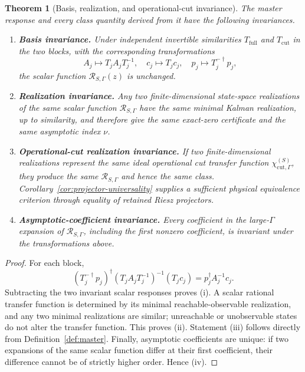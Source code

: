 \documentclass[11pt]{article}
\newtheorem{theorem}{Theorem}[section]
\theoremstyle{definition}
\theoremstyle{remark}
\theoremstyle{plain}
\newcommand{\R}{\mathcal R}
\newcommand{\full}{\mathrm{full}}
\newcommand{\cut}{\mathrm{cut}}
\begin{document}
\begin{theorem}[Basis, realization, and operational-cut invariance]\label{thm:invariance}
The master response and every class quantity derived from it have the following invariances.
\begin{enumerate}[label=(\roman*)]
  \item \textbf{Basis invariance.}  Under independent invertible similarities $T_{\full}$ and $T_{\cut}$ in the two blocks, with the corresponding transformations
  \[
   A_j\mapsto T_jA_jT_j^{-1},\quad c_j\mapsto T_jc_j,
   \quad p_j\mapsto T_j^{-\dagger}p_j,
  \]
  the scalar function $\R_{S,\Gamma}(z)$ is unchanged.
  \item \textbf{Realization invariance.}  Any two finite-dimensional state-space realizations of the same scalar function $\R_{S,\Gamma}$ have the same minimal Kalman realization, up to similarity, and therefore give the same exact-zero certificate and the same asymptotic index $\nu$.
  \item \textbf{Operational-cut realization invariance.}  If two finite-dimensional realizations represent the same ideal operational cut transfer function $\chi_{\cut,\Gamma}^{(S)}$, they produce the same $\R_{S,\Gamma}$ and hence the same class.  Corollary~\ref{cor:projector-universality} supplies a sufficient physical equivalence criterion through equality of retained Riesz projectors.
  \item \textbf{Asymptotic-coefficient invariance.}  Every coefficient in the large-$\Gamma$ expansion of $\R_{S,\Gamma}$, including the first nonzero coefficient, is invariant under the transformations above.
\end{enumerate}
\end{theorem}

\begin{proof}
For each block,
\[
 (T_j^{-\dagger}p_j)^\dagger(T_jA_jT_j^{-1})^{-1}(T_jc_j)
 =p_j^\dagger A_j^{-1}c_j.
\]
Subtracting the two invariant scalar responses proves (i).  A scalar rational transfer function is determined by its minimal reachable-observable realization, and any two minimal realizations are similar; unreachable or unobservable states do not alter the transfer function.  This proves (ii).  Statement (iii) follows directly from Definition~\ref{def:master}.  Finally, asymptotic coefficients are unique: if two expansions of the same scalar function differ at their first coefficient, their difference cannot be of strictly higher order.  Hence (iv).
\end{proof}
\end{document}
